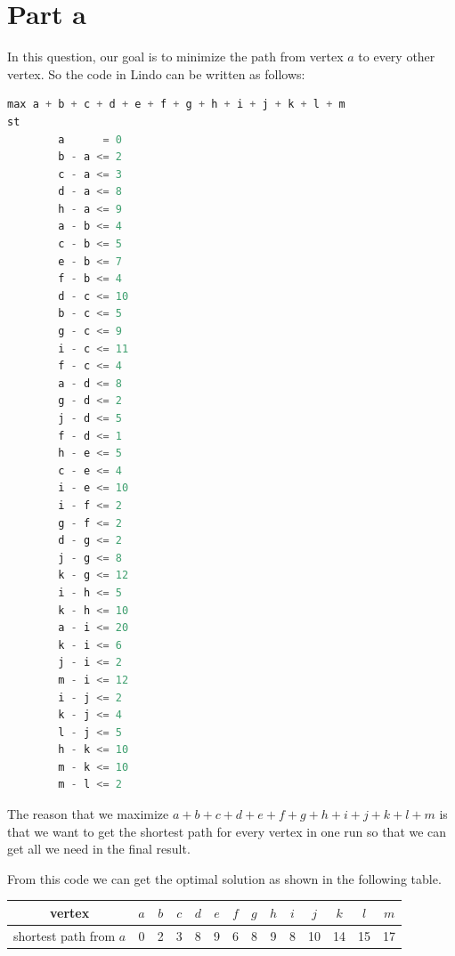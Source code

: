 \documentclass[11pt]{scrreprt}
\begin{document}
\section{Part a}
In this question, our goal is to minimize the path from vertex $a$ to every other vertex. So the code in Lindo can be written as follows:
\begin{lstlisting}[language=c]
max a + b + c + d + e + f + g + h + i + j + k + l + m
st
        a      = 0 
        b - a <= 2
        c - a <= 3
        d - a <= 8
        h - a <= 9
        a - b <= 4
        c - b <= 5
        e - b <= 7
        f - b <= 4
        d - c <= 10
        b - c <= 5
        g - c <= 9
        i - c <= 11
        f - c <= 4
        a - d <= 8
        g - d <= 2
        j - d <= 5
        f - d <= 1
        h - e <= 5
        c - e <= 4
        i - e <= 10
        i - f <= 2
        g - f <= 2
        d - g <= 2
        j - g <= 8
        k - g <= 12
        i - h <= 5
        k - h <= 10
        a - i <= 20
        k - i <= 6
        j - i <= 2
        m - i <= 12
        i - j <= 2
        k - j <= 4
        l - j <= 5
        h - k <= 10
        m - k <= 10
        m - l <= 2
\end{lstlisting}

The reason that we maximize $a+b+c+d+e+f+g+h+i+j+k+l+m$ is that we want to get the shortest path for every vertex in one run so that we can get all we need in the final result.

From this code we can get the optimal solution as shown in the following table.\\
\begin{tabular}{|c|c|c|c|c|c|c|c|c|c|c|c|c|c|}
	\hline vertex & $a$   &  $b$ & $c$ & $d$ & $e$ & $f$ & $g$ & $h$ & $i$  & $j$ & $k$ & $l$ & $m$   \\
	\hline shortest path from $a$ & 0 & 2 & 3 & 8 & 9 & 6 & 8 & 9 & 8 & 10 & 14 & 15 & 17       \\
	\hline
\end{tabular} \\
\end{document}

